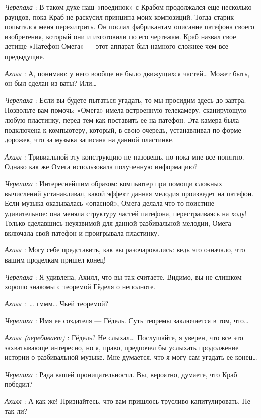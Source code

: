 \emph{Черепаха} : В таком духе наш «поединок» с Крабом продолжался еще несколько раундов, пока Краб не раскусил принципа моих композиций. Тогда старик попытался меня перехитрить. Он послал фабрикантам описание патефона своего изобретения, который они и изготовили по его чертежам. Краб назвал свое детище «Патефон Омега» --- этот аппарат был намного сложнее чем все предыдущие.

\emph{Ахилл} : А, понимаю: у него вообще не было движущихся частей\ldots{} Может быть, он был сделан из ваты? Или\ldots{}

\emph{Черепаха} : Если вы будете пытаться угадать, то мы просидим здесь до завтра. Позвольте вам помочь: «Омега» имела встроенную телекамеру, сканирующую любую пластинку, перед тем как поставить ее на патефон. Эта камера была подключена к компьютеру, который, в свою очередь, устанавливал по форме дорожек, что за музыка записана на данной пластинке.

\emph{Ахилл} : Тривиальной эту конструкцию не назовешь, но пока мне все понятно. Однако как же Омега использовала полученную информацию?

\emph{Черепаха} : Интереснейшим образом: компьютер при помощи сложных вычислений устанавливал, какой эффект данная мелодия произведет на патефон. Если музыка оказывалась «опасной», Омега делала что-то поистине удивительное: она меняла структуру частей патефона, перестраиваясь на ходу! Только сделавшись неуязвимой для данной разбивальной мелодии, Омега включала свой патефон и проигрывала пластинку.

\emph{Ахилл} : Могу себе представить, как вы разочаровались: ведь это означало, что вашим проделкам пришел конец!

\emph{Черепаха} : Я удивлена, Ахилл, что вы так считаете. Видимо, вы не слишком хорошо знакомы с теоремой Гёделя о неполноте.

\emph{Ахилл} :~\ldots{} гммм\ldots{} Чьей теоремой?

\emph{Черепаха} : Имя ее создателя --- Гёдель. Суть теоремы заключается в том, что\ldots{}

\emph{Ахилл (перебивает)} : Гёдель? Не слыхал\ldots{} Послушайте, я уверен, что все это захватывающе интересно, но я, право, предпочел бы услыхать продолжение истории о разбивальной музыке. Мне думается, что я могу сам угадать ее конец\ldots{}

\emph{Черепаха} : Рада вашей проницательности. Вы, вероятно, думаете, что Краб победил?

\emph{Ахилл} : А как же! Признайтесь, что вам пришлось трусливо капитулировать. Не так ли?

